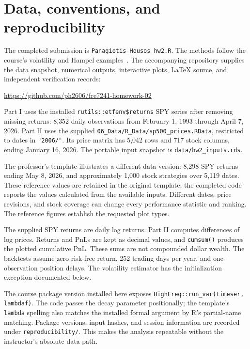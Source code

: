 \documentclass[11pt,letterpaper]{article}
\begin{document}
\tableofcontents
\clearpage
{}

\section{Data, conventions, and reproducibility}
\label{sec:data}
The completed submission is \texttt{Panagiotis\_Housos\_hw2.R}. The methods
follow the course's volatility and Hampel examples~\cite{univariate,app}.
The accompanying repository supplies the data snapshot, numerical outputs,
interactive plots, LaTeX source, and independent verification records:
\begin{center}
\url{https://github.com/ph2606/fre7241-homework-02}
\end{center}

Part I uses the installed \texttt{rutils::etfenv\$returns} SPY series after
removing missing returns: 8,352 daily observations from February 1, 1993
through April 7, 2026. Part II uses the supplied
\texttt{06\_Data/R\_Data/sp500\_prices.RData}, restricted to dates in
\texttt{"2006/"}. Its price matrix has 5,042 rows and 717 stock columns,
ending January 16, 2026. The portable input snapshot is
\texttt{data/hw2\_inputs.rds}.

The professor's template illustrates a different data version: 8,298 SPY
returns ending May 8, 2026, and approximately 1,000 stock strategies over
5,119 dates. These reference values are retained in the original template;
the completed code reports the values calculated from the available inputs.
Different dates, price revisions, and stock coverage can change every
performance statistic and ranking. The reference figures establish the
requested plot types.

The supplied SPY returns are daily log returns. Part II computes differences
of log prices. Returns and PnLs are kept as decimal values, and
\texttt{cumsum()} produces the plotted cumulative PnL. These sums are not
compounded dollar wealth. The backtests assume zero risk-free return,
252 trading days per year, and one-observation position delays. The
volatility estimator has the initialization exception documented below.

The course package version installed here exposes
\texttt{HighFreq::run\_var(timeser, lambdaf)}. The code passes the decay
parameter positionally; the template's \texttt{lambda} spelling also
matches the installed formal argument by R's partial-name matching.
Package versions, input hashes, and session
information are recorded under \texttt{reproducibility/}. This makes the
analysis repeatable without the instructor's absolute data path.
\end{document}
